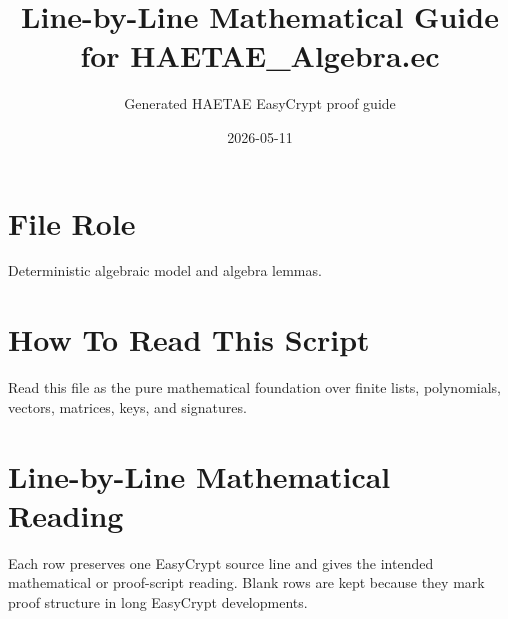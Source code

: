 \documentclass[10pt]{article}
\title{Line-by-Line Mathematical Guide for HAETAE\_Algebra.ec}
\author{Generated HAETAE EasyCrypt proof guide}
\date{2026-05-11}
\begin{document}
\maketitle

\section*{File Role}
Deterministic algebraic model and algebra lemmas.

\section*{How To Read This Script}
Read this file as the pure mathematical foundation over finite lists, polynomials, vectors, matrices, keys, and signatures.

\section*{Line-by-Line Mathematical Reading}
Each row preserves one EasyCrypt source line and gives the intended mathematical
or proof-script reading.  Blank rows are kept because they mark proof structure
in long EasyCrypt developments.
\end{document}
